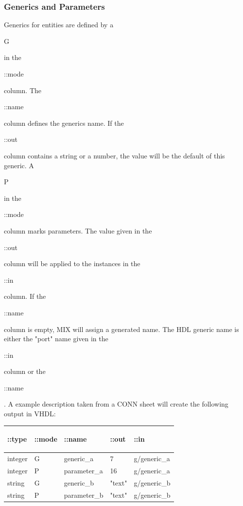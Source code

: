 \documentclass[a4paper,12pt]{article}
\begin{document}
\subsubsection{Generics and Parameters}
Generics for entities are defined by a \begin{bf}G\end{bf} in the \begin{tt}::mode\end{tt} column. The \begin{tt}::name\end{tt} column defines the generics name. If the \begin{tt}::out\end{tt} column contains a string or a number, the value will be the default of this generic.\newline
A \begin{bf}P\end{bf} in the \begin{tt}::mode\end{tt} column marks parameters. The value given in the \begin{tt}::out\end{tt} column will be applied to the instances in the \begin{tt}::in\end{tt} column.\newline
If the \begin{tt}::name\end{tt} column is empty, MIX will assign a generated name. The HDL generic name is either the "port" name given in the \begin{tt}::in\end{tt} column or the \begin{tt}::name\end{tt}.\newline
A example description taken from a CONN sheet will create the following output in VHDL:\\
\begin{table}[htb]\begin{tabular}{|p{3cm}|p{2cm}|p{3cm}|p{2cm}|p{3cm}|}\hline
\begin{bf}::type\end{bf} & \begin{bf}::mode\end{bf} & \begin{bf}::name\end{bf} & \begin{bf}::out\end{bf} & \begin{bf}::in\end{bf}\\\hline
integer & G & generic\_a & 7 & g/generic\_a \\\hline
integer & P & parameter\_a & 16 & g/generic\_a \\\hline
string & G & generic\_b & "text" & g/generic\_b \\\hline
string & P & parameter\_b & "text" & g/generic\_b \\\hline
\end{tabular}\end{table}\\
\end{document}

